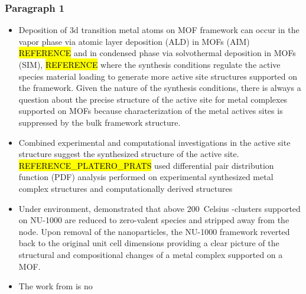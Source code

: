 \documentclass[journal=jctcce,manuscript=article]{achemso}
\begin{document}
\subsubsection{Paragraph 1}
\begin{itemize}
    \item Deposition of 3d transition metal atoms on MOF framework can occur in the vapor phase via atomic layer deposition (ALD) in MOFs (AIM) \hl{REFERENCE} and in condensed phase via solvothermal deposition in MOFs (SIM), \hl{REFERENCE} where the synthesis conditions regulate the active species material loading to generate more active site structures supported on the framework. Given the nature of the synthesis conditions, there is always a question about the precise structure of the active site for metal complexes supported on MOFs because characterization of the metal actives sites is suppressed by the bulk framework structure.  
    \item Combined experimental and computational investigations in the active site structure suggest the synthesized structure of the active site. \hl{REFERENCE_PLATERO_PRATS} used differential pair distribution function (PDF) analysis performed on experimental synthesized metal complex structures and computationally derived structures  
    
    \item Under  environment, \citeauthor{Halder2020} demonstrated that above \SI{200}{Celsius} -clusters supported on NU-1000 are reduced to zero-valent  species and stripped away from the node.\cite{Halder2020} Upon removal of the  nanoparticles, the NU-1000 framework reverted back to the original unit cell dimensions providing a clear picture of the structural and compositional changes of a metal complex supported on a MOF.  
    \item The work from \citeauthor{Halder2020} is no
\end{itemize}



\end{document}
